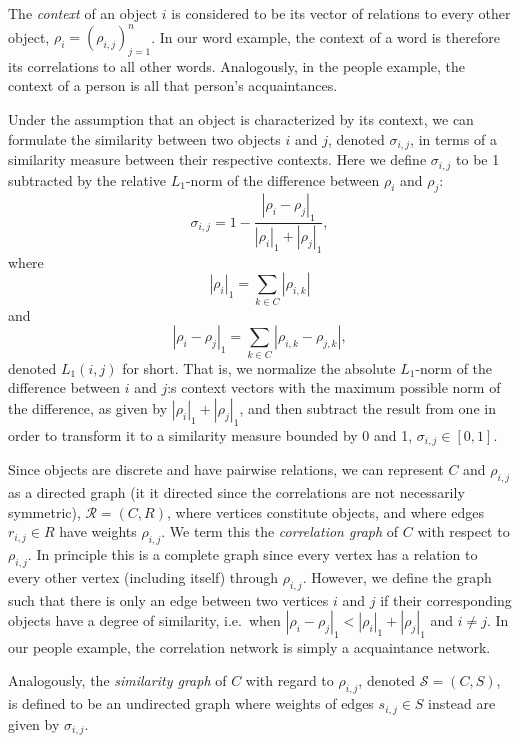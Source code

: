 \documentclass{kais}
\newcommand{\rn}[1]{\rho_{#1}}
\newcommand{\rns}[1]{|\rn{#1}|_1}
\newcommand{\sy}[1]{\sigma_{#1}}
\newcommand{\nm}[1]{L_1(#1)}
\newcommand{\dnm}[2]{|\rn{#1}-\rn{#2}|_1}
\begin{document}
The \emph{context} of an object $i$ is considered to be its vector of relations to every other object, $\rn{i} =
(\rn{i,j})_{j=1}^n$. In our word example, the context of a word is therefore its correlations to all other words. Analogously, 
in the people example, the context of a person is all that person's acquaintances.

Under the assumption that an object is characterized by its context, we can formulate the
similarity between two objects $i$ and $j$, denoted $\sy{i,j}$, in terms of a similarity measure between their
respective contexts.
Here we define $\sy{i,j}$ to be 1 subtracted by the relative $L_1$-norm of the difference between $\rn{i}$ and $\rn{j}$:
\begin{equation}\label{eq:sim}
\sy{i,j} = 1 - \frac{\dnm{i}{j}}{\rns{i} + \rns{j}},
\end{equation}
where
\begin{equation}\label{eq:totrel}
\rns{i} = \sum_{k \in C} | \rn{i,k}|
\end{equation}
and
\begin{equation}\label{}
\dnm{i}{j} =  \sum_{k \in C} | \rn{i,k} - \rn{j,k} |,
\end{equation}
denoted $\nm{i,j}$ for short.
That is, we normalize the absolute $L_1$-norm of the difference between $i$ and $j$:s context vectors with the maximum
possible norm of the difference, as given by $\rns{i} + \rns{j}$, and then subtract the result from one in order to
transform it to a similarity measure bounded by 0 and 1, $\sy{i,j} \in [0, 1]$.

Since objects are discrete and have pairwise relations, we can represent $C$ and $\rn{i,j}$ as a directed graph
(it it directed since the correlations are not necessarily symmetric),
$\mathcal{R} = (C, R)$, where vertices constitute objects, and where edges $r_{i,j} \in R$ have weights $\rn{i,j}$. We
term this the \emph{correlation graph} of $C$ with respect to $\rn{i,j}$. In principle this is a complete graph since
every vertex has a relation to every other vertex (including itself) through $\rn{i,j}$. However, we define the graph
such that there is only an edge between two vertices $i$ and $j$ if their corresponding objects have a degree of
similarity, i.e.\ when $\dnm{i}{j} < \rns{i} + \rns{j}$ and $i \neq j$. In our people example, the correlation network 
is simply a acquaintance network.

Analogously, the \emph{similarity graph} of $C$ with regard to $\rn{i,j}$, denoted $\mathcal{S} = (C, S)$, is defined
to be an undirected graph where weights of edges $s_{i,j} \in S$ instead are given by $\sy{i,j}$.
\end{document}
